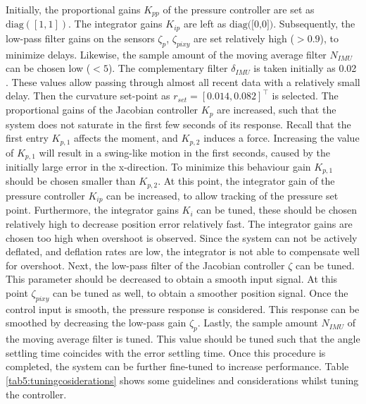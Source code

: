 Initially, the proportional gains $K_{pp}$ of the pressure controller are set as $\text{diag}([1,1])$. The integrator gains $K_{ip}$ are left as $\text{diag([0,0])}$. Subsequently, the low-pass filter gains on the sensors $\zeta_p$, $\zeta_{pixy}$ are set relatively high ($>0.9$), to minimize delays. Likewise, the sample amount of the moving average filter $N_{IMU}$ can be chosen low ($<5$). The complementary filter $\delta_{IMU}$ is taken initially as 0.02 \cite{compfilter}. These values allow passing through almost all recent data with a relatively small delay. Then the curvature set-point as $r_{set} = [0.014,0.082]^\top$ is selected. The proportional gains of the Jacobian controller $K_p$ are increased, such that the system does not saturate in the first few seconds of its response. Recall that the first entry $K_{p,1}$ affects the moment, and $K_{p,2}$ induces a force. Increasing the value of $K_{p,1}$ will result in a swing-like motion in the first seconds, caused by the initially large error in the x-direction. To minimize this behaviour gain $K_{p,1}$ should be chosen smaller than $K_{p,2}$. At this point, the integrator gain of the pressure controller $K_{ip}$ can be increased, to allow tracking of the pressure set point. Furthermore, the integrator gains $K_i$ can be tuned, these should be chosen relatively high to decrease position error relatively fast. The integrator gains are chosen too high when overshoot is observed. Since the system can not be actively deflated, and deflation rates are low, the integrator is not able to compensate well for overshoot. Next, the low-pass filter of the Jacobian controller $\zeta$ can be tuned. This parameter should be decreased to obtain a smooth input signal. At this point $\zeta_{pixy}$ can be tuned as well, to obtain a smoother position signal. Once the control input is smooth, the pressure response is considered. This response can be smoothed by decreasing the low-pass gain $\zeta_p$. Lastly, the sample amount $N_{IMU}$ of the moving average filter is tuned. This value should be tuned such that the angle settling time coincides with the error settling time. Once this procedure is completed, the system can be further fine-tuned to increase performance. Table \ref{tab5:tuningcosiderations} shows some guidelines and considerations whilst tuning the controller.

\newpage


